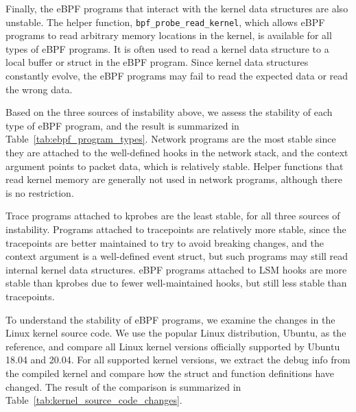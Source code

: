 Finally, the eBPF programs that interact with the kernel data structures are also unstable.
The helper function, \texttt{bpf\_probe\_read\_kernel},
which allows eBPF programs to read arbitrary memory locations in the kernel,
is available for all types of eBPF programs.
It is often used to read a kernel data structure to a local buffer or struct in the eBPF program.
Since kernel data structures constantly evolve, the eBPF programs may fail to read the expected data or read the wrong data.


Based on the three sources of instability above, we assess the stability of each type of eBPF program,
and the result is summarized in Table~\ref{tab:ebpf_program_types}.
Network programs are the most stable since they are attached to the well-defined hooks in the network stack,
and the context argument points to packet data, which is relatively stable.
Helper functions that read kernel memory are generally not used in network programs, although there is no restriction.

Trace programs attached to kprobes are the least stable, for all three sources of instability.
Programs attached to tracepoints are relatively more stable, since the tracepoints are better maintained to try to avoid breaking changes,
and the context argument is a well-defined event struct, but such programs may still read internal kernel data structures.
eBPF programs attached to LSM hooks are more stable than kprobes due to fewer well-maintained hooks, but still less stable than tracepoints.


To understand the stability of eBPF programs, we examine the changes in the Linux kernel source code.
We use the popular Linux distribution, Ubuntu, as the reference, and compare all Linux kernel versions officially supported by Ubuntu 18.04 and 20.04.
For all supported kernel versions, we extract the debug info from the compiled kernel and compare how the struct and function definitions have changed.
The result of the comparison is summarized in Table~\ref{tab:kernel_source_code_changes}.



